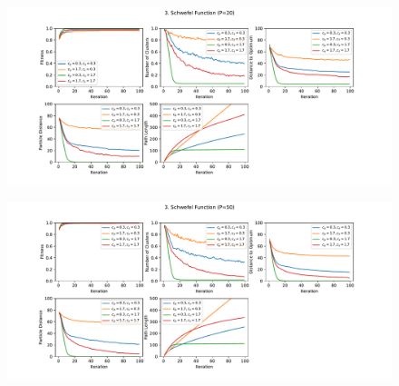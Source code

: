 \documentclass[12pt]{article}
\begin{document}
\begin{figure}
	\centering
	\includegraphics[width=1\textwidth]{figures/ex4/ex4-3-20.pdf}
	\label{fig:ex4-3-20}
\end{figure}
\begin{figure}
	\centering
	\includegraphics[width=1\textwidth]{figures/ex4/ex4-3-50.pdf}
	\label{fig:ex4-3-50}
\end{figure}
\end{document}
